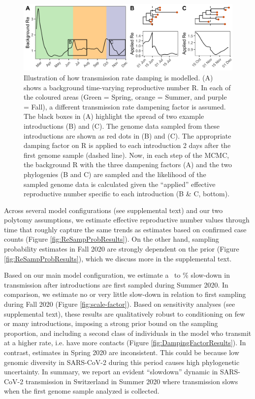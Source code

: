 \documentclass[9pt,twoside,lineno]{pnas-new} %
\begin{document}
\begin{figure}[h!]
\centering
\includegraphics[width=0.75\linewidth]{figures/phylodynamic_method_example.png}
\caption{Illustration of how transmission rate damping is modelled. (A) shows a background time-varying reproductive number R. In each of the coloured areas (Green = Spring, orange = Summer, and purple = Fall), a different transmission rate dampening factor is assumed. The black boxes in (A) highlight the spread of two example introductions (B) and (C). The genome data sampled from these introductions are shown as red dots in (B) and (C). The appropriate damping factor on R is applied to each introduction 2 days after the first genome sample (dashed line). Now, in each step of the MCMC, the background R with the three dampening factors (A) and the two phylogenies (B and C) are sampled and the likelihood of the sampled genome data is calculated given the ``applied'' effective reproductive number specific to each introduction (B \& C, bottom).}  
\label{fig:phylo-methods}
\end{figure}

Across several model configurations (see supplemental text) and our two polytomy assumptions, we estimate effective reproductive number values through time that roughly capture the same trends as estimates based on confirmed case counts (Figure \ref{fig:ReSampProbResults}). On the other hand, sampling probability estimates in Fall 2020 are strongly dependent on the prior (Figure \ref{fig:ReSampProbResults}), which we discuss more in the supplemental text.

Based on our main model configuration, we estimate a \summermaxdampingpercentmedianCHEnosampUB\ to \summermindampingpercentmedianCHEnosampUB\% slow-down in transmission after introductions are first sampled during Summer 2020. In comparison, we estimate no or very little slow-down in relation to first sampling during Fall 2020 (Figure \ref{fig:scale-factor}). Based on sensitivity analyses (see supplemental text), these results are qualitatively robust to conditioning on few or many introductions, imposing a strong prior bound on the sampling proportion, and including a second class of individuals in the model who transmit at a higher rate, i.e. have more contacts (Figure \ref{fig:DampingFactorResults}). In contrast, estimates in Spring 2020 are inconsistent. This could be because low genomic diversity in SARS-CoV-2 during this period causes high phylogenetic uncertainty. In summary, we report an evident ``slowdown'' dynamic in SARS-CoV-2 transmission in Switzerland in Summer 2020 where transmission slows when the first genome sample analyzed is collected.
\end{document}
